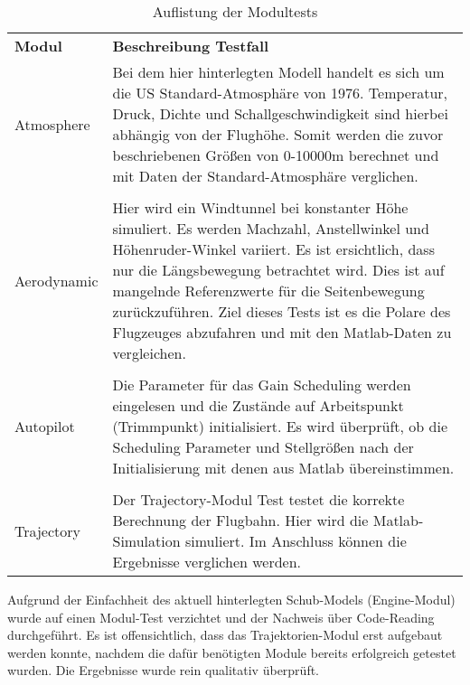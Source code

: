 \begin{table}[h]
\centering	\begin{tabular}{l p{12cm}}
		\textbf{Modul} & \textbf{Beschreibung Testfall}\\
		Atmosphere & Bei dem hier hinterlegten Modell  handelt es sich um die US Standard-Atmosphäre von 1976.  Temperatur, Druck, Dichte und Schallgeschwindigkeit sind hierbei abhängig von der Flughöhe. Somit werden die zuvor beschriebenen Größen von 0-10000m berechnet und mit Daten der Standard-Atmosphäre verglichen.\\\\
		Aerodynamic & Hier wird ein Windtunnel bei konstanter Höhe simuliert. Es werden Machzahl, Anstellwinkel und Höhenruder-Winkel variiert. Es ist ersichtlich, dass nur die Längsbewegung betrachtet wird. Dies ist auf mangelnde Referenzwerte für die Seitenbewegung zurückzuführen. Ziel dieses Tests ist es die Polare des Flugzeuges abzufahren und mit den Matlab-Daten zu vergleichen. \\\\
		Autopilot &  Die Parameter für das Gain Scheduling werden eingelesen und die Zustände auf Arbeitspunkt (Trimmpunkt) initialisiert. Es wird überprüft, ob die Scheduling Parameter und Stellgrößen nach der Initialisierung mit denen aus Matlab übereinstimmen.\\\\
		Trajectory & Der Trajectory-Modul Test testet die korrekte Berechnung der Flugbahn. Hier wird die Matlab-Simulation simuliert. Im Anschluss können die Ergebnisse verglichen werden.
	\end{tabular}
\label{tab:modultests}
\caption{Auflistung der Modultests}
\end{table}
\newpage
Aufgrund der Einfachheit des aktuell hinterlegten Schub-Models (Engine-Modul) wurde auf einen Modul-Test verzichtet und der Nachweis über Code-Reading durchgeführt.
Es ist offensichtlich, dass das Trajektorien-Modul erst aufgebaut werden konnte, nachdem die dafür benötigten Module bereits erfolgreich getestet wurden. Die Ergebnisse wurde rein qualitativ überprüft.


